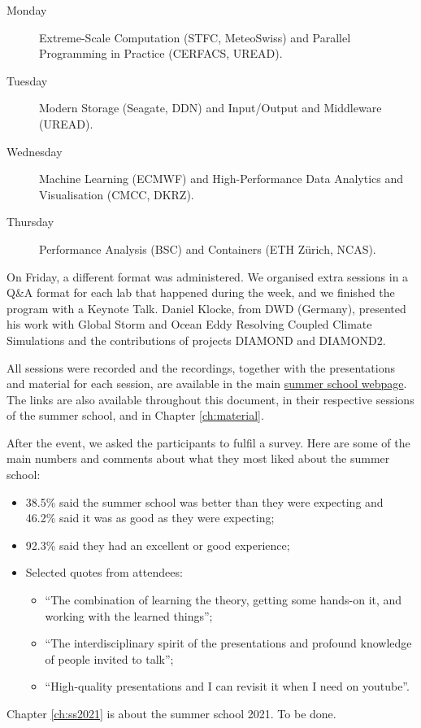 \begin{description}

\item[Monday] Extreme-Scale Computation (STFC, MeteoSwiss) and Parallel Programming in Practice (CERFACS, UREAD).

\item[Tuesday] Modern Storage (Seagate, DDN) and Input/Output and Middleware (UREAD).

\item[Wednesday] Machine Learning (ECMWF) and High-Performance Data Analytics and Visualisation (CMCC, DKRZ).

\item[Thursday] Performance Analysis (BSC) and Containers (ETH Zürich, NCAS).

\end{description}

On Friday, a different format was administered. We organised extra sessions in a Q\&A format for each lab that happened during the week, and we finished the program with a Keynote Talk. Daniel Klocke, from DWD (Germany), presented his work with Global Storm and Ocean Eddy Resolving Coupled Climate Simulations and the contributions of projects DIAMOND and DIAMOND2.

All sessions were recorded and the recordings, together with the presentations and material for each session, are available in the main \href{https://hps.vi4io.org/events/2020/esiwace-school}{summer school webpage}. The links are also available throughout this document, in their respective sessions of the summer school, and in Chapter \ref{ch:material}.

After the event, we asked the participants to fulfil a survey. Here are some of the main numbers and comments about what they most liked about the summer school:

\begin{itemize}

\item 38.5\% said the summer school was better than they were expecting and 46.2\% said it was as good as they were expecting;

\item 92.3\% said they had an excellent or good experience;

\item Selected quotes from attendees:

\begin{itemize}

\item ``The combination of learning the theory, getting some hands-on it, and working with the learned things'';
\item ``The interdisciplinary spirit of the presentations and profound knowledge of people invited to talk'';
\item ``High-quality presentations and I can revisit it when I need on youtube''.

\end{itemize}

\end{itemize}

Chapter \ref{ch:ss2021} is about the summer school 2021. To be done.